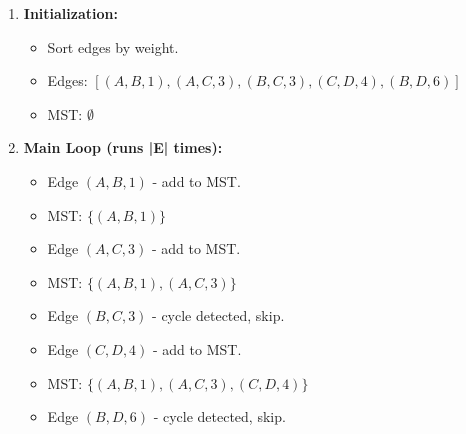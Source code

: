 \documentclass{article}
\begin{document}
\begin{enumerate}
    \item \textbf{Initialization:}
    \begin{itemize}
        \item Sort edges by weight.
        \item Edges: \( [(A, B, 1), (A, C, 3), (B, C, 3), (C, D, 4), (B, D, 6)] \)
        \item MST: \( \emptyset \)
    \end{itemize}
    \item \textbf{Main Loop (runs |E| times):}
    \begin{itemize}
        \item Edge \( (A, B, 1) \) - add to MST.
        \item MST: \( \{(A, B, 1)\} \)
        \item Edge \( (A, C, 3) \) - add to MST.
        \item MST: \( \{(A, B, 1), (A, C, 3)\} \)
        \item Edge \( (B, C, 3) \) - cycle detected, skip.
        \item Edge \( (C, D, 4) \) - add to MST.
        \item MST: \( \{(A, B, 1), (A, C, 3), (C, D, 4)\} \)
        \item Edge \( (B, D, 6) \) - cycle detected, skip.
    \end{itemize}
\end{enumerate}
\end{document}
